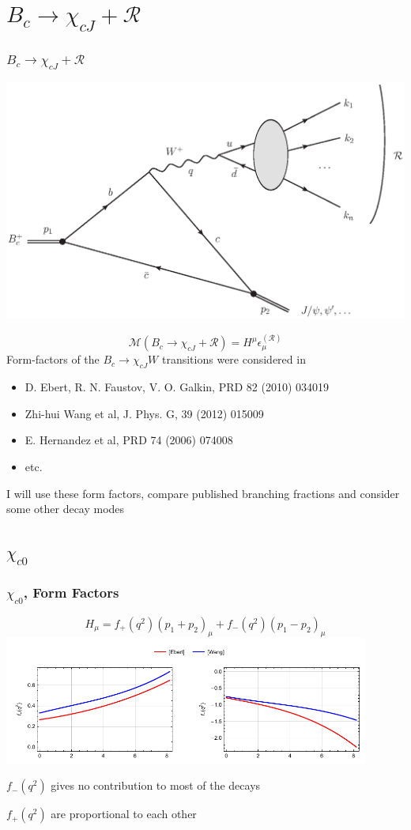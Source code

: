 \documentclass{beamer}
\newcommand{\R}{\mathcal{R}}
\newcommand{\M}{\mathcal{M}}
\begin{document}
\section{$B_c\to \chi_{cJ}+\R$}
\begin{frame}
  \frametitle{$B_c\to \chi_{cJ}+\R$}
\begin{center}
  \includegraphics[width=0.5\columnwidth]{diags_BcCCW}
\end{center}
$$\M\left(B_c \to \chi_{cJ} + \R\right) = H^\mu \epsilon^{(\R)}_\mu$$
Form-factors of the $B_c\to \chi_{cJ}W$ transitions were considered in
\begin{itemize}
\item D. Ebert, R. N. Faustov, V. O. Galkin, PRD 82 (2010) 034019 
\item Zhi-hui Wang et al,  	J. Phys. G,  39 (2012) 015009
\item E. Hernandez et al, PRD      74 (2006) 074008
\item etc.
\end{itemize}
I will use these form factors, compare published branching fractions and consider some other decay modes
\end{frame}

\subsection{$\chi_{c0}$}
\begin{frame}
  \frametitle{$\chi_{c0}$, Form Factors}
  $$
  H_\mu = f_{+}\left(q^2\right) \left(p_1+p_2\right)_\mu + f_{-}\left(q^2\right) \left(p_1-p_2\right)_\mu 
  $$
  \includegraphics[width=0.9\textwidth]{figs/ff_chi_c0}

  $f_{-}(q^2)$ gives no contribution to most of the decays
  
  $f_{+}(q^2)$ are proportional to each other
\end{frame}
\end{document}
